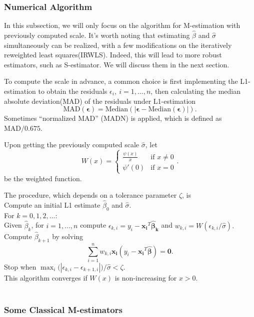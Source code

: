\documentclass[conference]{IEEEtran}
\begin{document}
\subsubsection{Numerical Algorithm} In this subsection, we will only focus on the algorithm for M-estimation with previously computed scale. It's worth noting that estimating $\hat{\beta}$ and $\hat{\sigma}$ simultaneously can be realized, with a few modifications on the iteratively reweighted least squares(IRWLS). Indeed, this will lead to more robust estimators, such as S-estimator. We will discuss them in the next section. 

To compute the scale in advance, a common choice is first implementing the L1-estimation to obtain the residuals $\epsilon_i, \ i = 1,...,n$, then calculating the median absolute deviation(MAD) of the residuals under L1-estimation
$$\text{MAD}(\mathbold{\epsilon}) = \text{Median}(|\mathbold{\epsilon} - \text{Median}(\mathbold{\epsilon})|).$$
Sometimes “normalized MAD” (MADN) is applied, which is defined as $\text{MAD}/0.675$.

Upon getting the previously computed scale $\hat{\sigma}$, let
$$W(x) =\begin{cases} \frac{\psi(x)}{x} & \text{if } x \neq 0 \\ \psi'(0) & \text{if } x = 0 \end{cases}.$$
\noindent be the weighted function.

The procedure, which depends on a tolerance parameter $\zeta$, is \\

\noindent {} Compute an initial L1 estimate $\hat{\beta}_0$ and $\hat{\sigma}$. \\
\noindent {} For $k = 0,1,2, ...$: \\
 Given $\hat{\beta}_k$, for $i = 1,...,n$ compute $\epsilon_{k,i} = y_i - \mathbold{x_i}^T \mathbold{\hat{\beta}_k}$ and $w_{k,i} = W(\epsilon_{k,i}/\hat{\sigma}).$ \\
 Compute $\hat{\beta}_{k+1}$ by solving
$$\sum_{i=1}^n w_{k,i} \mathbold{x_i} (y_i - \mathbold{x_i}^T \mathbold{\hat{\beta}}) = \mathbf{0}.$$
\noindent {} Stop when $\max_i \bigg( |\epsilon_{k,i} - \epsilon_{k+1,i}| \bigg)/ \hat{\sigma} < \zeta.$ \\

This algorithm converges if $W(x)$ is non-increasing for $x > 0$. \\~


\subsubsection{Some Classical M-estimators} \\~
\end{document}
